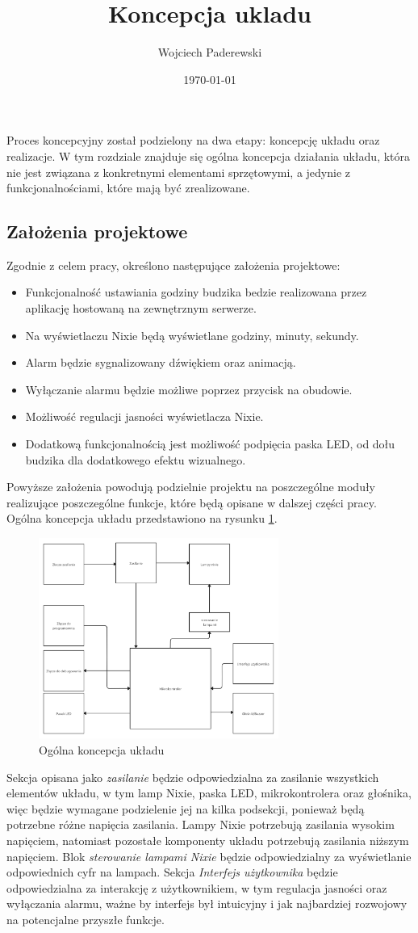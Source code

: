 \documentclass[../main.tex]{subfiles}
\author{Wojciech Paderewski}
\date{\today}
\title{Koncepcja ukladu}
\begin{document}
 Proces koncepcyjny został podzielony na dwa etapy: koncepcję układu oraz realizacje. W tym rozdziale znajduje się ogólna koncepcja 
 działania układu, która nie jest związana z konkretnymi elementami sprzętowymi, a jedynie z funkcjonalnościami, które mają być zrealizowane.
 \subsection{Założenia projektowe}
Zgodnie z celem pracy, określono następujące założenia projektowe:
\begin{itemize}
    \item Funkcjonalność ustawiania godziny budzika bedzie realizowana przez aplikację hostowaną na zewnętrznym serwerze.
    \item Na wyświetlaczu Nixie będą wyświetlane godziny, minuty, sekundy.
    \item Alarm będzie sygnalizowany dźwiękiem oraz animacją.
    \item Wyłączanie alarmu będzie możliwe poprzez przycisk na obudowie.
    \item Możliwość regulacji jasności wyświetlacza Nixie.
    \item Dodatkową funkcjonalnością jest możliwość podpięcia paska LED, od dołu budzika dla dodatkowego efektu wizualnego.
\end{itemize}
Powyższe założenia powodują podzielnie projektu na poszczególne moduły realizujące poszczególne funkcje, które będą opisane w dalszej części pracy.
Ogólna koncepcja układu przedstawiono na rysunku \ref{fig:concept}.
\begin{figure}[H]
    \centering
    \includegraphics[width=0.7\textwidth]{Nixie-concept.png}
    \caption{Ogólna koncepcja układu}
    \label{fig:concept}
\end{figure}
Sekcja opisana jako \textit{zasilanie} będzie odpowiedzialna za zasilanie wszystkich elementów układu, w tym lamp Nixie, paska LED, mikrokontrolera oraz głośnika,
więc będzie wymagane podzielenie jej na kilka podsekcji, ponieważ będą potrzebne różne napięcia zasilania. Lampy Nixie potrzebują zasilania wysokim napięciem,
natomiast pozostałe komponenty układu potrzebują zasilania niższym napięciem. Blok \textit{sterowanie lampami Nixie} będzie odpowiedzialny za wyświetlanie odpowiednich cyfr na lampach.
Sekcja \textit{Interfejs użytkownika} będzie odpowiedzialna za interakcję z użytkownikiem, w tym regulacja jasności oraz wyłączania alarmu, ważne by interfejs był 
intuicyjny i jak najbardziej rozwojowy na potencjalne przyszłe funkcje.
\end{document}
